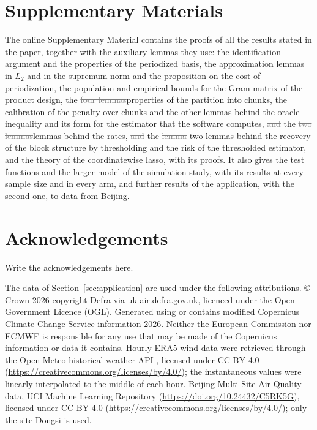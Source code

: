 \documentclass[12pt]{article} %
\theoremstyle{definition}
\theoremstyle{plain}
\begin{document}
\section*{Supplementary Materials}

The online Supplementary Material contains the proofs of all the results
stated in the paper, together with the auxiliary lemmas they use: the
identification argument and the properties of the periodized basis, the
approximation lemmas in $L_2$ and in the supremum norm and the proposition on
the cost of periodization, the population and empirical bounds for the Gram
matrix of the product design, the \textcolor{gray}{\sout{four lemmas}}\textcolor{colR1}{properties of the
partition into chunks, the calibration of the penalty over chunks and the
other lemmas} behind the oracle inequality \textcolor{colR1}{and its form for the
estimator that the software computes},
\textcolor{gray}{\sout{and}} the \textcolor{gray}{\sout{two lemmas}}\textcolor{colR1}{lemmas} behind the rates\textcolor{colR1}{, \textcolor{gray}{\sout{and}} the \textcolor{gray}{\sout{lemma}} two lemmas behind
the recovery of the block structure by thresholding} \textcolor{colR1}{and the risk of
the thresholded estimator, and the theory of the coordinatewise lasso, with
its proofs}\textcolor{colR1}{. It also gives the test functions and the larger
model of the simulation study, with its results at every sample size and in
every arm, and further results of the application, with the second one, to
data from Beijing}.

\section*{Acknowledgements}

Write the acknowledgements here.
\par
{\color{colR1}
The data of Section~\ref{sec:application} are used under the following
attributions. \copyright{} Crown 2026 copyright Defra via
uk-air.defra.gov.uk, licenced under the Open Government Licence (OGL).
Generated using or contains modified Copernicus Climate Change Service
information 2026. Neither the European Commission nor ECMWF is responsible
for any use that may be made of the Copernicus information or data it
contains. Hourly ERA5 wind data were retrieved through the Open-Meteo
historical weather API
\citetext{\citealp{Zippenfenig-OpenMeteo-2024}; \url{https://open-meteo.com/}},
licensed under CC BY 4.0 (\url{https://creativecommons.org/licenses/by/4.0/});
the instantaneous values were linearly interpolated to the middle of each
hour. Beijing Multi-Site Air Quality data, UCI Machine Learning Repository
(\url{https://doi.org/10.24432/C5RK5G}), licensed under CC BY 4.0
(\url{https://creativecommons.org/licenses/by/4.0/}); only the site Dongsi is
used.
\par
}
\end{document}
